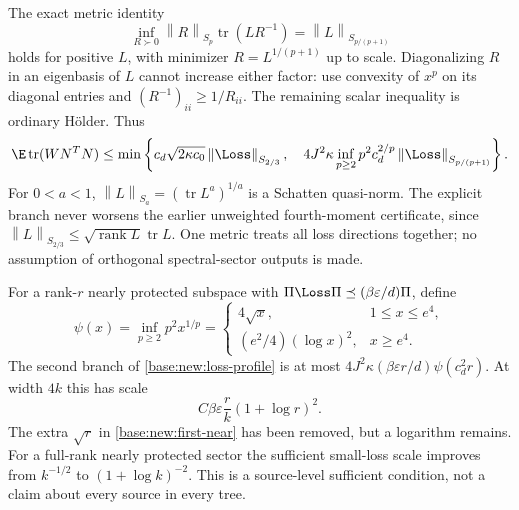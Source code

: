 \documentclass[11pt,oneside,openany,a4paper]{book}
\numberwithin{equation}{chapter}
\theoremstyle{definition}
\theoremstyle{remark}
\DeclareMathOperator{\tr}{tr}\DeclareMathOperator{\rank}{rank}
\newcommand{\Sn}[2]{\left\lVert#1\right\rVert_{S_{#2}}}
\begin{document}
The exact metric identity
\begin{equation}\label{base:new:one-metric}
 \inf_{R\succ0}\Sn Rp\tr(LR^{-1})=\Sn L{p/(p+1)}
\end{equation}
holds for positive $L$, with minimizer $R=L^{1/(p+1)}$ up to scale. Diagonalizing $R$ in an eigenbasis of $L$ cannot increase either factor: use convexity of $x^p$ on its diagonal entries and $(R^{-1})_{ii}\ge1/R_{ii}$. The remaining scalar inequality is ordinary H\"older. Thus
\begin{equation}\label{base:new:loss-profile}
 \E\tr(WN^TN)\le
 \min\left\{c_d\sqrt{2\kappa c_0}\Sn\Loss{2/3},\quad
 4J^2\kappa\inf_{p\ge2}p^2c_d^{2/p}\Sn\Loss{p/(p+1)}\right\}.
\end{equation}
For $0<a<1$, $\Sn La=(\tr L^a)^{1/a}$ is a Schatten quasi-norm. The explicit branch never worsens the earlier unweighted fourth-moment certificate, since $\Sn L{2/3}\le\sqrt{\rank L}\tr L$. One metric treats all loss directions together; no assumption of orthogonal spectral-sector outputs is made.

For a rank-$r$ nearly protected subspace with $\Pi\Loss\Pi\preceq(\beta\varepsilon/d)\Pi$, define
\[
 \psi(x)=\inf_{p\ge2}p^2x^{1/p}
 =\begin{cases}4\sqrt x,&1\le x\le e^4,\\(e^2/4)(\log x)^2,&x\ge e^4.\end{cases}
\]
The second branch of \eqref{base:new:loss-profile} is at most
$4J^2\kappa(\beta\varepsilon r/d)\psi(c_d^2r)$.
At width $4k$ this has scale
\begin{equation}\label{base:new:near-log}
 C\beta\varepsilon\frac rk(1+\log r)^2.
\end{equation}
The extra $\sqrt r$ in \eqref{base:new:first-near} has been removed, but a logarithm remains. For a full-rank nearly protected sector the sufficient small-loss scale improves from $k^{-1/2}$ to $(1+\log k)^{-2}$. This is a source-level sufficient condition, not a claim about every source in every tree.
\end{document}
